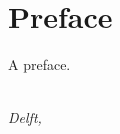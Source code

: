 \chapter*{Preface}

A preface.

\begin{flushright}
{\makeatletter\itshape
    \@author \\
    Delft, \monthname{} \the\year{}
\makeatother}
\end{flushright}
